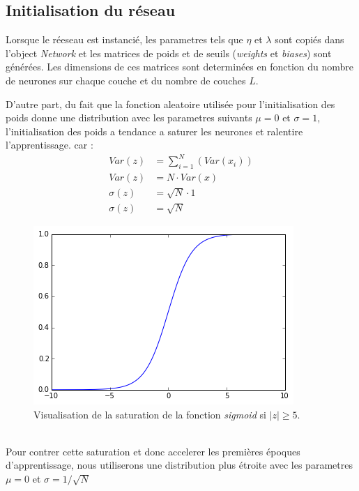 \documentclass[11pt]{article}
\begin{document}
\subsection{Initialisation du r\'eseau}
Lorsque le r\'eeseau est instanci\'e, les parametres tels que $\eta$ et $\lambda$
sont copi\'es dans l'object \emph{Network} et les matrices de poids et de
seuils (\emph{weights} et \emph{biases}) sont g\'en\'er\'ees. Les dimensions
de ces matrices sont determin\'ees en fonction du nombre de neurones sur chaque
couche et du nombre de couches $L$.


D'autre part, du fait que la fonction aleatoire utilis\'ee pour l'initialisation
des poids donne une distribution avec les parametres suivants $\mu=0$ et $\sigma=1$,
l'initialisation des poids a tendance a saturer les neurones et ralentire l'apprentissage.
car :
\begin{equation}
	\begin{aligned}
		Var(z) &= \sum_{i=1}^N(Var(x_i)) \\
		Var(z) &= N \cdot Var(x) \\
		\sigma(z) &= \sqrt{N} \cdot 1 \\
		\sigma(z) &= \sqrt{N}
	\end{aligned}
\end{equation}

\begin{figure}[htp]
	\centering
	\includegraphics[scale=.5]{img/sigmoid_sat.png}
	\caption{Visualisation de la saturation de la fonction \emph{sigmoid} si
	$|z| \ge 5$.}
\end{figure} \\

Pour contrer cette saturation et donc accelerer les premi\`eres \'epoques
d'apprentissage, nous utiliserons une distribution plus \'etroite avec les
parametres $\mu=0$ et $\sigma =1/\sqrt{N}$ \\
\end{document}
